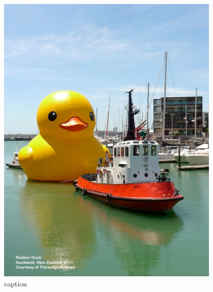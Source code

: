 \begin{figure}[hb!]
  \centering
  \includegraphics[width=0.95\textwidth]{img/rubberduck.jpg}
  \caption{caption}
  \label{fig:label}
\end{figure}


